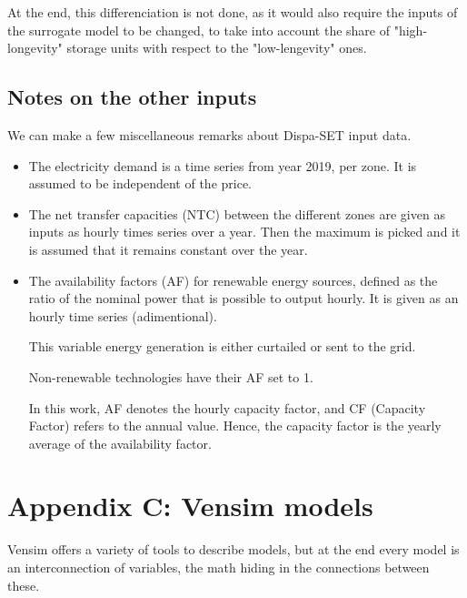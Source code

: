 At the end, this differenciation is not done, as it would also require the inputs of the surrogate model to be changed, to take into account the share of "high-longevity" storage units with respect to the "low-lengevity" ones.

\subsection{Notes on the other inputs}

We can make a few miscellaneous remarks about Dispa-SET input data.

\begin{itemize}
    \item The electricity demand is a time series from year 2019, per zone. It is assumed to be independent of the price.
    \item The net transfer capacities (NTC) between the different zones are given as inputs as hourly times series over a year. Then the maximum is picked and it is assumed that it remains constant over the year.
    \item The availability factors (AF) for renewable energy sources, defined as the ratio of the nominal power that is possible to output hourly. It is given as an hourly time series (adimentional).
    
    This variable energy generation is either curtailed or sent to the grid.

    Non-renewable technologies have their AF set to 1.

    In this work, AF denotes the hourly capacity factor, and CF (Capacity Factor) refers to the annual value. Hence, the capacity factor is the yearly average of the availability factor. 
\end{itemize}

\newpage
\section*{Appendix C: Vensim models}

Vensim offers a variety of tools to describe models, but at the end every model is an interconnection of variables, the math hiding in the connections between these. 

